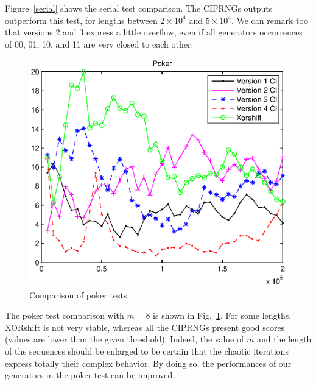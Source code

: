 Figure~\ref{serial} shows the serial test comparison. The CIPRNGs outputs outperform this test, for lengths between $2\times 10^4$ and $5 \times 10^4$. 
We can remark too that versions 2 and 3 express a little overflow, even if all generators occurrences of 00, 01, 10, and 11 are very closed to each other.

\begin{figure}
\centering
\includegraphics[scale=0.8]{poker.eps}
\caption{Comparison of poker tests}
\label{poker}
\end{figure}

The poker test comparison with $m=8$ is shown in Fig.~\ref{poker}. For some lengths, XORshift is not very stable, whereas 
all the CIPRNGs present good scores (values are lower than the given threshold). 
Indeed, the value of $m$ and the length of the sequences should be enlarged to be certain that the chaotic iterations express totally their complex behavior. By doing so, the performances of our generators in the poker test can be improved.

